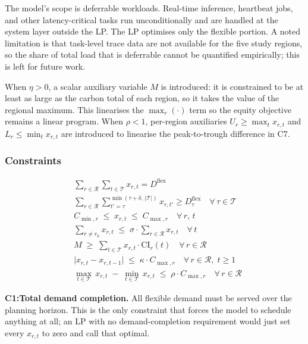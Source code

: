 \documentclass[11pt, a4paper]{article}
\begin{document}
The model's scope is deferrable workloads. Real-time inference, heartbeat jobs, and other latency-critical tasks run unconditionally and are handled at the system layer outside the LP. The LP optimises only the flexible portion. A noted limitation is that task-level trace data are not available for the five study regions, so the share of total load that is deferrable cannot be quantified empirically; this is left for future work.

When $\eta > 0$, a scalar auxiliary variable $M$ is introduced: it is constrained to be at least as large as the carbon total of each region, so it takes the value of the regional maximum. This linearises the $\max_r(\cdot)$ term so the equity objective remains a linear program. When $\rho < 1$, per-region auxiliaries $U_r \geq \max_t x_{r,t}$ and $L_r \leq \min_t x_{r,t}$ are introduced to linearise the peak-to-trough difference in C7.

\subsubsection{Constraints}

\begin{align}
  &\sum_{r \in \mathcal{R}} \sum_{t \in \mathcal{T}} x_{r,t} = D^{\text{flex}}
    \tag{C1}\label{eq:c1} \\[4pt]
  &\sum_{r \in \mathcal{R}} \sum_{t'=\tau}^{\min(\tau+\delta,\,|\mathcal{T}|)} x_{r,t'} \geq D_{\tau}^{\text{flex}} \quad \forall\,\tau \in \mathcal{T}
    \tag{C2}\label{eq:c2} \\[4pt]
  &C_{\min,r} \;\leq\; x_{r,t} \;\leq\; C_{\max,r} \quad \forall\, r,\, t
    \tag{C3}\label{eq:c3} \\[4pt]
  &\sum_{r \neq r_0} x_{r,t} \;\leq\; \sigma \cdot \sum_{r \in \mathcal{R}} x_{r,t} \quad \forall\, t
    \tag{C4}\label{eq:c4} \\[4pt]
  &M \;\geq\; \sum_{t \in \mathcal{T}} x_{r,t} \cdot \text{CI}_r(t) \quad \forall\, r \in \mathcal{R}
    \tag{C5}\label{eq:c5} \\[4pt]
  &\bigl|x_{r,t} - x_{r,t-1}\bigr| \;\leq\; \kappa \cdot C_{\max,r} \quad \forall\, r \in \mathcal{R},\; t \geq 1
    \tag{C6}\label{eq:c6} \\[4pt]
  &\max_{t \in \mathcal{T}}\, x_{r,t} \;-\; \min_{t \in \mathcal{T}}\, x_{r,t} \;\leq\; \rho \cdot C_{\max,r} \quad \forall\, r \in \mathcal{R}
    \tag{C7}\label{eq:c7}
\end{align}

\textbf{C1:Total demand completion.}
All flexible demand must be served over the planning horizon. This is the only constraint that forces the model to schedule anything at all; an LP with no demand-completion requirement would just set every $x_{r,t}$ to zero and call that optimal.
\end{document}
